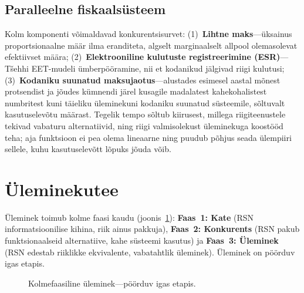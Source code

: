 \documentclass[11pt,a4paper,twocolumn]{article}
\begin{document}
\subsection{Paralleelne fiskaalsüsteem}

Kolm komponenti võimaldavad konkurentsisurvet: (1)~\textbf{Lihtne maks}---üksainus proportsionaalne määr ilma eranditeta, algselt marginaalselt allpool olemasolevat efektiivset määra; (2)~\textbf{Elektrooniline kulutuste registreerimine (ESR)}---Tšehhi EET-mudeli ümberpööramine, nii et kodanikud jälgivad riigi kulutusi; (3)~\textbf{Kodaniku suunatud maksujaotus}---alustades esimesel aastal mõnest protsendist ja jõudes kümnendi järel kusagile madalatest kahekohalistest numbritest kuni täieliku üleminekuni kodaniku suunatud süsteemile, sõltuvalt kasutuselevõtu määrast. Tegelik tempo sõltub kiirusest, millega riigiteenustele tekivad vabaturu alternatiivid, ning riigi valmisolekust üleminekuga koostööd teha; aja funktsioon ei pea olema lineaarne ning puudub põhjus seada ülempiiri sellele, kuhu kasutuselevõtt lõpuks jõuda võib.

\section{Üleminekutee}

Üleminek toimub kolme faasi kaudu (joonis~\ref{fig:migration}): \textbf{Faas~1: Kate} (RSN informatsioonilise kihina, riik ainus pakkuja), \textbf{Faas~2: Konkurents} (RSN pakub funktsionaalseid alternatiive, kahe süsteemi kasutus) ja \textbf{Faas~3: Üleminek} (RSN edestab riiklikke ekvivalente, vabatahtlik üleminek). Üleminek on pöörduv igas etapis.

\begin{figure}[ht]
\centering
{}
\caption{Kolmefaasiline üleminek---pöörduv igas etapis.}
\label{fig:migration}
\end{figure}
\end{document}
